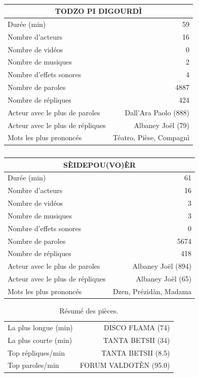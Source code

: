     \begin{table}[]
    \centering
    \caption{}
    \begin{tabular}{lr}\toprule\multicolumn{2}{c}{TODZO PI DIGOURDÌ} \\\midrule
\multicolumn{1}{l}{Durée (min)}&59\\
\multicolumn{1}{l}{Nombre d'acteurs}&16\\
\multicolumn{1}{l}{Nombre de vidéos}&0\\
\multicolumn{1}{l}{Nombre de musiques}&2\\
\multicolumn{1}{l}{Nombre d'effets sonores}&4\\
\multicolumn{1}{l}{Nombre de paroles}&4887\\
\multicolumn{1}{l}{Nombre de répliques}&424\\
\multicolumn{1}{l}{Acteur avec le plus de paroles}&Dall'Ara Paolo (888)\\
\multicolumn{1}{l}{Acteur avec le plus de répliques}&Albaney Joël (79)\\
\multicolumn{1}{l}{Mots les plus prononcés}&Téatro, Pièse, Compagnì\\
    \bottomrule
    \end{tabular}%
    \end{table}
    \begin{table}[]
    \centering
    \caption{}
    \begin{tabular}{lr}\toprule\multicolumn{2}{c}{SÈIDEPOU(VO)ÈR} \\\midrule
\multicolumn{1}{l}{Durée (min)}&61\\
\multicolumn{1}{l}{Nombre d'acteurs}&16\\
\multicolumn{1}{l}{Nombre de vidéos}&3\\
\multicolumn{1}{l}{Nombre de musiques}&3\\
\multicolumn{1}{l}{Nombre d'effets sonores}&0\\
\multicolumn{1}{l}{Nombre de paroles}&5674\\
\multicolumn{1}{l}{Nombre de répliques}&418\\
\multicolumn{1}{l}{Acteur avec le plus de paroles}&Albaney Joël (894)\\
\multicolumn{1}{l}{Acteur avec le plus de répliques}&Albaney Joël (65)\\
\multicolumn{1}{l}{Mots les plus prononcés}&Dzen, Prézidàn, Madama\\
    \bottomrule
    \end{tabular}%
    \end{table}
\begin{table}[h]
\centering
\caption{Résumé des pièces.}
\begin{tabular}{lr}
    \toprule
La plus longue (min) & DISCO FLAMA (74) \\
La plus courte (min) & TANTA BETSII (34) \\
Top répliques/min & TANTA BETSII (8.5) \\
Top paroles/min & FORUM VALDOTÈN (95.0) \\
\bottomrule
\end{tabular}%
\end{table}

\newpage
\thispagestyle{empty} %
\mbox{}               %
\newpage